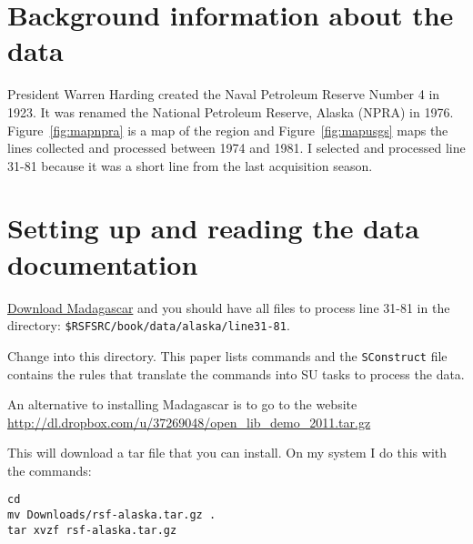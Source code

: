 \section{Background information about the data}

President Warren Harding created the Naval Petroleum Reserve Number 4
in 1923.  It was renamed the National Petroleum Reserve, Alaska (NPRA)
in 1976.  Figure~\ref{fig:mapnpra} is a map of the region and 
Figure~\ref{fig:mapusgs} maps the lines collected and processed between 1974
and 1981.  I selected and processed line 31-81 because it was a short
line from the last acquisition season.

\section{Setting up and reading the data documentation}
\href{http://www.ahay.org/wiki/Download}{Download Madagascar} and you
should have all files to process line 31-81 in 
the directory: \texttt{\$RSFSRC/book/data/alaska/line31-81}.

Change into this directory.  This paper lists commands and the 
\texttt{SConstruct} file contains the rules that translate the commands 
into SU tasks to process the data.

An alternative to installing Madagascar is to go to the website \url{http://dl.dropbox.com/u/37269048/open_lib_demo_2011.tar.gz}

This will download a tar file that you can install.  On my system I
do this with the commands:
\begin{verbatim}
cd
mv Downloads/rsf-alaska.tar.gz .
tar xvzf rsf-alaska.tar.gz
\end{verbatim}

